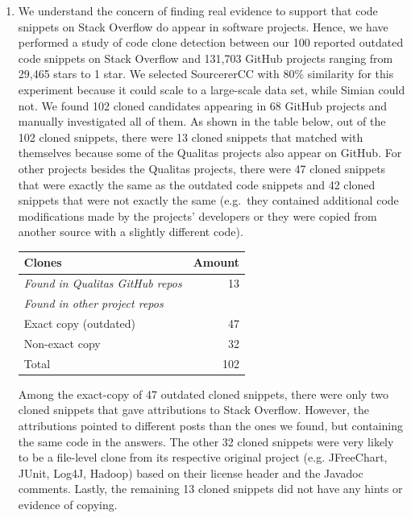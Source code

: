 \documentclass[a4paper,twoside,10pt]{reviewresponse}
\begin{document}
\begin{enumerate}
	\item We understand the concern of finding real evidence to support that code snippets on Stack Overflow do appear in software projects. Hence, we have performed a study of code clone detection between our 100 reported outdated code snippets on Stack Overflow and 131,703 GitHub projects ranging from 29,465 stars to 1 star. We selected SourcererCC with 80\% similarity for this experiment because it could scale to a large-scale data set, while Simian could not. We found 102 cloned candidates appearing in 68 GitHub projects and manually investigated all of them. As shown in the table below, out of the 102 cloned snippets, there were 13 cloned snippets that matched with themselves because some of the Qualitas projects also appear on GitHub. For other projects besides the Qualitas projects, there were 47 cloned snippets that were exactly the same as the outdated code snippets and 42 cloned snippets that were not exactly the same (e.g.~they contained additional code modifications made by the projects' developers or they were copied from another source with a slightly different code). 
	
	\begin{table}[H]
		\centering
		\label{tab:outdated_github}
		\begin{tabular}{lr}
			\toprule
			Clones & Amount \\
			\midrule
			\textit{Found in Qualitas GitHub repos} & 13 \\
			\midrule
			\textit{Found in other project repos} & \\
			Exact copy (outdated) & 47 \\
			Non-exact copy & 32 \\
			\midrule
			Total & 102 \\
			\bottomrule
		\end{tabular}
	\end{table}

	Among the exact-copy of 47 outdated cloned snippets, there were only two cloned snippets that gave attributions to Stack Overflow. However, the attributions pointed to different posts than the ones we found, but containing the same code in the answers. The other 32 cloned snippets were very likely to be a file-level clone from its respective original project (e.g. JFreeChart, JUnit, Log4J, Hadoop) based on their license header and the Javadoc comments. Lastly, the remaining 13 cloned snippets did not have any hints or evidence of copying.
	

\end{enumerate}
\end{document}
